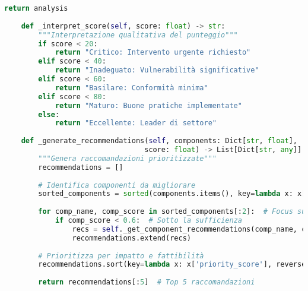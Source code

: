 \begin{lstlisting}[language=Python, caption=Classe GISTFramework Completa]
        return analysis
    
    def _interpret_score(self, score: float) -> str:
        """Interpretazione qualitativa del punteggio"""
        if score < 20:
            return "Critico: Intervento urgente richiesto"
        elif score < 40:
            return "Inadeguato: Vulnerabilità significative"
        elif score < 60:
            return "Basilare: Conformità minima"
        elif score < 80:
            return "Maturo: Buone pratiche implementate"
        else:
            return "Eccellente: Leader di settore"
    
    def _generate_recommendations(self, components: Dict[str, float], 
                                 score: float) -> List[Dict[str, any]]:
        """Genera raccomandazioni prioritizzate"""
        recommendations = []
        
        # Identifica componenti da migliorare
        sorted_components = sorted(components.items(), key=lambda x: x[1])
        
        for comp_name, comp_score in sorted_components[:2]:  # Focus sui 2 peggiori
            if comp_score < 0.6:  # Sotto la sufficienza
                recs = self._get_component_recommendations(comp_name, comp_score)
                recommendations.extend(recs)
        
        # Prioritizza per impatto e fattibilità
        recommendations.sort(key=lambda x: x['priority_score'], reverse=True)
        
        return recommendations[:5]  # Top 5 raccomandazioni
    

\end{lstlisting}
